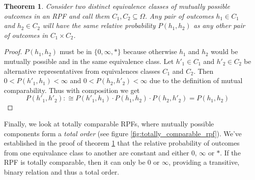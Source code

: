 \documentclass[twoside]{article}
\theoremstyle{plain}%
\newtheorem{theorem}{Theorem}[section]
\theoremstyle{definition}
\theoremstyle{remark}
\begin{document}
\begin{theorem}
\label{thm:equivalence_class_same}
Consider two distinct equivalence classes of mutually possible outcomes in an RPF and call them \(C_1, C_2 \subseteq \Omega\). Any pair of outcomes \(h_1 \in C_1\) and \(h_2 \in C_2\) will have the same relative probability \(P(h_1, h_2)\) as any other pair of outcomes in \(C_1 \times C_2\). 
\end{theorem}

\begin{proof}
\(P(h_1, h_2)\) must be in \(\{0, \infty, \ast\}\) because otherwise \(h_1\) and \(h_2\) would be mutually possible and in the same equivalence class. Let \(h'_1 \in C_1\) and \(h'_2 \in C_2\) be alternative representatives from equivalences classes \(C_1\) and \(C_2\). Then \(0 < P(h'_1, h_1) < \infty\) and \(0 < P(h_2, h'_2) < \infty\) due to the definition of mutual comparability. Thus with composition we get
\[P(h'_1, h'_2) :\cong P(h'_1, h_1) \cdot P(h_1, h_2) \cdot P(h_2, h'_2) = P(h_1, h_2)\]
\end{proof}

Finally, we look at totally comparable RPFs, where mutually possible components form a \textit{total order} (see figure \ref{fig:totally_comparable_rpf}). We've established in the proof of theorem \ref{thm:equivalence_class_same} that the relative probability of outcomes from one equivalance class to another are constant and either 0, \(\infty\) or \(\ast\). If the RPF is totally comparable, then it can only be 0 or \(\infty\), providing a transitive, binary relation and thus a total order.
\end{document}

